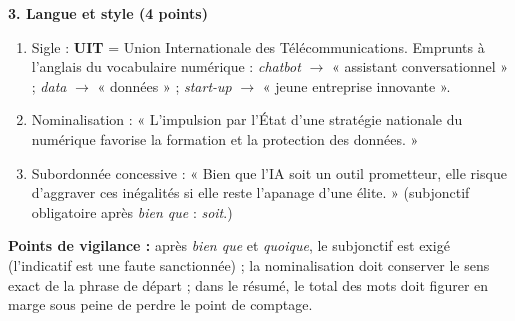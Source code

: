 \documentclass[11pt]{article}
\begin{document}
\begin{corrige}
\textbf{3. Langue et style (4 points)}
\begin{enumerate}
\item Sigle : \textbf{UIT} = Union Internationale des Télécommunications. Emprunts à l'anglais du vocabulaire numérique : \emph{chatbot} $\to$ « assistant conversationnel » ; \emph{data} $\to$ « données » ; \emph{start-up} $\to$ « jeune entreprise innovante ».
\item Nominalisation : « L'impulsion par l'État d'une stratégie nationale du numérique favorise la formation et la protection des données. »
\item Subordonnée concessive : « Bien que l'IA soit un outil prometteur, elle risque d'aggraver ces inégalités si elle reste l'apanage d'une élite. » (subjonctif obligatoire après \emph{bien que} : \emph{soit}.)
\end{enumerate}

\textbf{Points de vigilance :} après \emph{bien que} et \emph{quoique}, le subjonctif est exigé (l'indicatif est une faute sanctionnée) ; la nominalisation doit conserver le sens exact de la phrase de départ ; dans le résumé, le total des mots doit figurer en marge sous peine de perdre le point de comptage.
\end{corrige}
\end{document}
